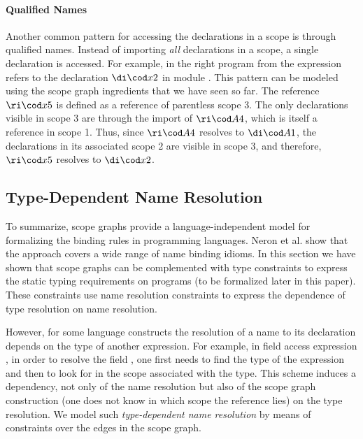 \paragraph{Qualified Names}

Another common pattern for accessing the declarations in a scope is through
qualified names. Instead of importing \emph{all} declarations in a scope, a
single declaration is accessed. For example, in the right program from  the
expression  refers to the declaration $\dic{x}{2}$ in module
. This pattern can be modeled using the scope graph ingredients that
we have seen so far.
The reference $\ric{x}{5}$ is defined as a reference of parentless scope 3. The
only declarations visible in scope 3 are through the import of $\ric{A}{4}$,
which is itself a reference in scope 1. Thus, since $\ric{A}{4}$ resolves to
$\dic{A}{1}$, the declarations in its associated scope 2 are visible in scope 3,
and therefore, $\ric{x}{5}$ resolves to $\dic{x}{2}$.



\subsection{Type-Dependent Name Resolution}

\begin{figure}[t]
  
\end{figure}

To summarize, scope graphs provide a language-independent model for formalizing
the binding rules in programming languages. Neron et al.
\cite{NeronTVW-ESOP-2015} show that the approach covers a wide range of name
binding idioms.
In this section we have shown that scope graphs can be complemented with type
constraints to express the static typing requirements on programs (to be
formalized later in this paper).
These constraints use name resolution constraints to express the dependence of
type resolution on name resolution.

However, for some language constructs the resolution of a name to its
declaration depends on the type of another expression.
For example, in field access expression , in order to resolve the field
, one first needs to find the type of the expression  and then to
look for  in the scope associated with the type.
This scheme induces a dependency, not only of the name resolution but also of
the scope graph construction (one does not know in which scope the reference
 lies) on the type resolution.
We model such \emph{type-dependent name resolution} by means of constraints over
the edges in the scope graph.

